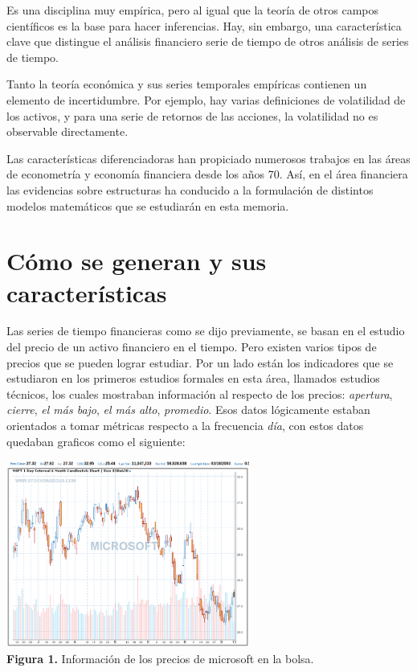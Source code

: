 Es una disciplina muy empírica, pero al igual que la teoría de otros campos científicos es la base para hacer inferencias. 
Hay, sin embargo, una característica clave que distingue el análisis financiero serie de tiempo de otros análisis de series de tiempo. 

Tanto la teoría económica y sus series temporales empíricas contienen un elemento de incertidumbre. Por ejemplo, 
hay varias definiciones de volatilidad de los activos, y para una serie de retornos de las acciones, la volatilidad no es observable directamente.

Las características diferenciadoras han propiciado numerosos trabajos en las áreas de econometría y economía financiera desde los años 70.
Así, en el área financiera las evidencias sobre estructuras ha conducido a la formulación de distintos modelos matemáticos que se estudiarán
en esta memoria.

\section{Cómo se generan y sus características}

Las series de tiempo financieras como se dijo previamente, se basan en el estudio del precio de un activo financiero en el tiempo. Pero existen 
varios tipos de precios que se pueden lograr estudiar. Por un lado están los indicadores que se estudiaron en los primeros estudios formales
en esta área, llamados estudios técnicos, los cuales mostraban información al respecto de los precios: \emph{apertura}, \emph{cierre}, \emph{el más bajo}, 
\emph{el más alto}, \emph{promedio}. Esos datos lógicamente estaban orientados a tomar métricas respecto a la frecuencia \emph{día}, con estos
datos quedaban graficos como el siguiente:

\begin{center}
	\includegraphics[width=0.6\textwidth]{images/microsoft} \\
	\textbf{Figura 1.} Información de los precios de microsoft en la bolsa.
\end{center}


